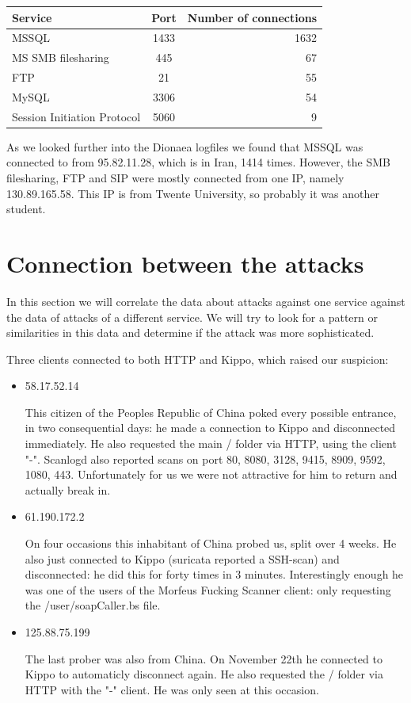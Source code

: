 \documentclass[11pt]{article}
\begin{document}
\begin{tabular}{|l|c|r|}
\hline
Service & Port & Number of connections \\ \hline
MSSQL  & 1433 & 1632 \\ \hline
MS SMB filesharing & 445 & 67 \\ \hline
FTP & 21 & 55 \\ \hline
MySQL & 3306 & 54 \\ \hline
Session Initiation Protocol & 5060 & 9 \\ \hline
\end{tabular}

As we looked further into the Dionaea logfiles we found that MSSQL was connected to from 95.82.11.28, which is in Iran, 1414 times. However, the SMB filesharing, FTP and SIP were mostly connected from one IP, namely 130.89.165.58. This IP is from Twente University, so probably it was another student.




\section{Connection between the attacks}
\label{Connection}
In this section we will correlate the data about attacks against one service against the data of attacks of a different service. We will try to look for a pattern or similarities in this data and determine if the attack was more sophisticated.

Three clients connected to both HTTP and Kippo, which raised our suspicion:
\begin{itemize}
\item 58.17.52.14

This citizen of the Peoples Republic of China poked every possible entrance, in two consequential days: he made a connection to Kippo and disconnected immediately. He also requested the main / folder via HTTP, using the client "-". Scanlogd also reported scans on port 80, 8080, 3128, 9415, 8909, 9592, 1080, 443. Unfortunately for us we were not attractive for him to return and actually break in.

\item 61.190.172.2

On four occasions this inhabitant of China probed us, split over 4 weeks. He also just connected to Kippo (suricata reported a SSH-scan) and disconnected: he did this for forty times in 3 minutes. Interestingly enough he was one of the users of the Morfeus Fucking Scanner client: only requesting the /user/soapCaller.bs file.

\item 125.88.75.199

The last prober was also from China. On November 22th he connected to Kippo to automaticly disconnect again. He also requested the / folder via HTTP with the "-" client. He was only seen at this occasion.

\end{itemize}
\end{document}
